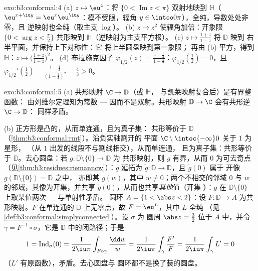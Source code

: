 \begin{solution}{exo:b3:conformal:4}
(a) $z \mapsto \eu^z$：将 $\{0 < \operatorname{Im}z <
\pi\}$ 双射地映到 $\mathbb H$（$\eu^{x+\iu y} =
\eu^x\eu^{\iu y}$：模不受限，辐角 $y \in
\intoo0\pi$），全纯，导数处处非零，且
逆映射也全纯（取主支 $\log$）。
(b) $z \mapsto z^2$ 使辐角加倍：开象限
$\{0 < \arg z < \frac\pi2\}$ 共形映到 $\mathbb
H$（逆映射为主支平方根）。
(c) $z \mapsto \frac{1 + z}{1 - z}$ 将 $\mathbb D$ 映到
右半平面，并保持上下对称性：它
将上半圆盘映到第一象限；
再由 (b) 平方，得到 $\mathbb H$：$z \mapsto \bigl(\frac{1
+ z}{1 - z}\bigr)^2$。
(d) 布拉施克因子 $\varphi_{1/2}(z) = \frac{z -
\frac12}{1 - \frac z2}$：$\varphi_{1/2}(\tfrac12) = 0$，且
$\varphi_{1/2}'(\tfrac12) = \frac{1 - \frac14}{(1 -
\frac14)^2} = \frac43 > 0$。
\end{solution}

\begin{solution}{exo:b3:conformal:5}
(a) 共形映射 $\C \to \mathbb D$（或 $\mathbb H$，
与凯莱映射复合后）是有界整函数：
由刘维尔定理知为常数 --- 因而不是双射。共形映射 $\mathbb
D \to \C$ 会有共形逆 $\C \to \mathbb D$：
同样矛盾。

(b) 正方形是凸的，从而单连通，且为真子集：
共形等价于 $\mathbb D$（\cref{thm:b3:conformal:rmt}）。沿负实轴割开的
平面 $\C\setminus\intoc{-\infty}0$ 关于 $1$ 为星形，
（从 $1$ 出发的线段不与割线相交），从而单连通，
且为真子集：共形等价于 $\mathbb D$。去心圆盘：若
$g \colon \mathbb D\setminus\{0\} \to \mathbb D$ 为
共形映射，则 $g$ 有界，从而 $0$ 为可去奇点
（见\cref{thm:b3:residues:riemanncw}）：$g$ 延拓为 $\tilde g
\colon \mathbb D \to \mathbb D$，且 $\tilde g(0)$ 属于
开像 $g(\mathbb D\setminus\{0\}) = \mathbb D$ 之中，
亦即某 $g(w)$，其中 $w \neq 0$；两个不相交的邻域
$0$ 与 $w$ 的邻域，其像为开集，并共享
$\tilde g(0)$，从而也共享\emph{其他}值（开集
）：$g$ 在
$\mathbb D\setminus\{0\}$ 上取某值两次 --- 与单射性矛盾。
圆环 $A = \{1 < \abs z < 2\}$：设 $F \colon \mathbb D
\to A$ 为共形映射。$F$ 在单连通的
$\mathbb D$ 上无零点，故 $F = \eu^L$，其中 $L$ 全纯
（见\cref{def:b3:conformal:simplyconnected}）。设 $\sigma$ 为
圆周 $\abs z = \frac32$ 位于 $A$ 中，并令 $\gamma =
F^{-1}\circ\sigma$，它是 $\mathbb D$ 中的闭路径；于是
\[
1 = \operatorname{Ind}_\sigma(0)
= \frac1{2\iu\pi}\int_{F\circ\gamma}\frac{\dd w}{w}
= \frac1{2\iu\pi}\int_\gamma\frac{F'}{F}
= \frac1{2\iu\pi}\int_\gamma L' = 0
\]
（$L'$ 有原函数），矛盾。去心圆盘与
圆环都不是换了装的圆盘。
\end{solution}

